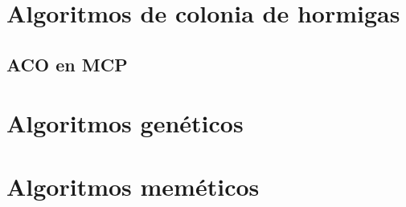 \section{Algoritmos de colonia de hormigas}

\subsection{ACO en MCP}


\section{Algoritmos genéticos}



\section{Algoritmos meméticos}
